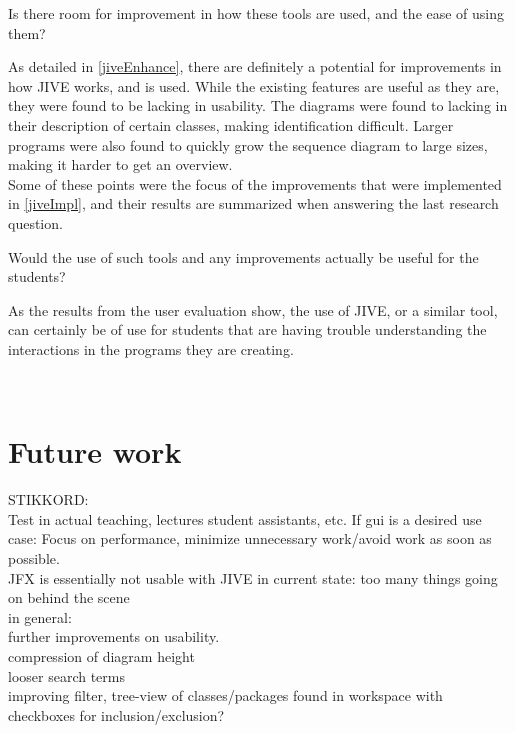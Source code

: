 \begin{theorem}
Is there room for improvement in how these tools are used, and the ease of using them?
\end{theorem}

As detailed in \autoref{jiveEnhance}, there are definitely a potential for improvements in how JIVE works, and is used.
While the existing features are useful as they are, they were found to be lacking in usability.
The diagrams were found to lacking in their description of certain classes, making identification difficult.
Larger programs were also found to quickly grow the sequence diagram to large sizes, making it harder to get an overview.
~\\

Some of these points were the focus of the improvements that were implemented in \autoref{jiveImpl}, and their results are summarized when answering the last research question.
~\\

\begin{theorem}
Would the use of such tools and any improvements actually be useful for the students?
\end{theorem}

As the results from the user evaluation show, the use of JIVE, or a similar tool, can certainly be of use for students that are having trouble understanding the interactions in the programs they are creating. %

~\\

\section{Future work}\label{conclusionFuture}
STIKKORD:\\
Test in actual teaching, lectures student assistants, etc.
If gui is a desired use case: Focus on performance, minimize unnecessary work/avoid work as soon as possible.\\
JFX is essentially not usable with JIVE in current state: too many things going on behind the scene\\

in general:\\
further improvements on usability.\\
compression of diagram height\\
looser search terms\\
improving filter, tree-view of classes/packages found in workspace with checkboxes for inclusion/exclusion?\\


